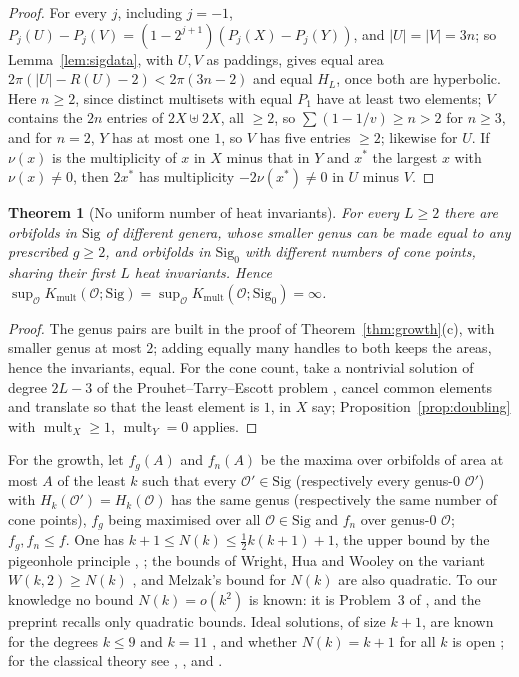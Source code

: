 \documentclass[pdflatex,sn-mathphys-num]{sn-jnl}
\theoremstyle{thmstyleone}%
\newtheorem{theorem}{Theorem}[section]%
\theoremstyle{thmstylethree}%
\newcommand{\Orb}{\mathcal{O}}
\newcommand{\Sig}{\mathrm{Sig}}
\newcommand{\Kmult}{K_{\mathrm{mult}}}
\newcommand{\mult}{\operatorname{mult}}
\begin{document}
\begin{proof}
For every $j$, including $j=-1$, $P_j(U)-P_j(V)=(1-2^{j+1})(P_j(X)-P_j(Y))$, and $|U|=|V|=3n$; so Lemma~\ref{lem:sigdata}, with $U,V$ as paddings, gives equal area $2\pi(|U|-R(U)-2)<2\pi(3n-2)$ and equal $H_L$, once both are hyperbolic. Here $n\ge2$, since distinct multisets with equal $P_1$ have at least two elements; $V$ contains the $2n$ entries of $2X\uplus2X$, all $\ge2$, so $\sum(1-1/v)\ge n>2$ for $n\ge3$, and for $n=2$, $Y$ has at most one $1$, so $V$ has five entries $\ge2$; likewise for $U$. If $\nu(x)$ is the multiplicity of $x$ in $X$ minus that in $Y$ and $x^*$ the largest $x$ with $\nu(x)\ne0$, then $2x^*$ has multiplicity $-2\nu(x^*)\ne0$ in $U$ minus $V$.
\end{proof}

\begin{theorem}[No uniform number of heat invariants]\label{thm:signonuniform}
For every $L\ge2$ there are orbifolds in $\Sig$ of different genera, whose smaller genus can be made equal to any prescribed $g\ge2$, and orbifolds in $\Sig_0$ with different numbers of cone points, sharing their first $L$ heat invariants. Hence $\sup_\Orb\Kmult(\Orb;\Sig)=\sup_\Orb\Kmult(\Orb;\Sig_0)=\infty$.
\end{theorem}

\begin{proof}
The genus pairs are built in the proof of Theorem~\ref{thm:growth}(c), with smaller genus at most $2$; adding equally many handles to both keeps the areas, hence the invariants, equal. For the cone count, take a nontrivial solution of degree $2L-3$ of the Prouhet--Tarry--Escott problem \cite[Prop.~3]{borweiningalls1994}, cancel common elements and translate so that the least element is $1$, in $X$ say; Proposition~\ref{prop:doubling} with $\mult_X\ge1$, $\mult_Y=0$ applies.
\end{proof}

For the growth, let $f_g(A)$ and $f_n(A)$ be the maxima over orbifolds of area at most $A$ of the least $k$ such that every $\Orb'\in\Sig$ (respectively every genus-$0$ $\Orb'$) with $H_k(\Orb')=H_k(\Orb)$ has the same genus (respectively the same number of cone points), $f_g$ being maximised over all $\Orb\in\Sig$ and $f_n$ over genus-$0$ $\Orb$; $f_g,f_n\le f$. One has $k+1\le N(k)\le\frac12k(k+1)+1$, the upper bound by the pigeonhole principle \cite[Props.~2--3]{borweiningalls1994}, \cite[\S1]{crootmaoyip2026}; the bounds of Wright, Hua and Wooley on the variant $W(k,2)\ge N(k)$ \cite{wright1935,hua1938,hua1949}, \cite[\S1]{crootmaoyip2026} and Melzak's bound for $N(k)$ \cite[p.~7]{borweiningalls1994} are also quadratic. To our knowledge no bound $N(k)=o(k^2)$ is known: it is Problem~3 of \cite[\S6]{borweiningalls1994}, and the preprint \cite[\S1]{crootmaoyip2026} recalls only quadratic bounds. Ideal solutions, of size $k+1$, are known for the degrees $k\le9$ and $k=11$ \cite{cmsv2024}, and whether $N(k)=k+1$ for all $k$ is open \cite[\S1]{crootmaoyip2026}; for the classical theory see \cite[Ch.~18]{hua1982}, \cite{dorwartbrown1937}, \cite[Ch.~11]{borwein2002} and \cite[\S8.1]{chen2025survey}.
\end{document}

